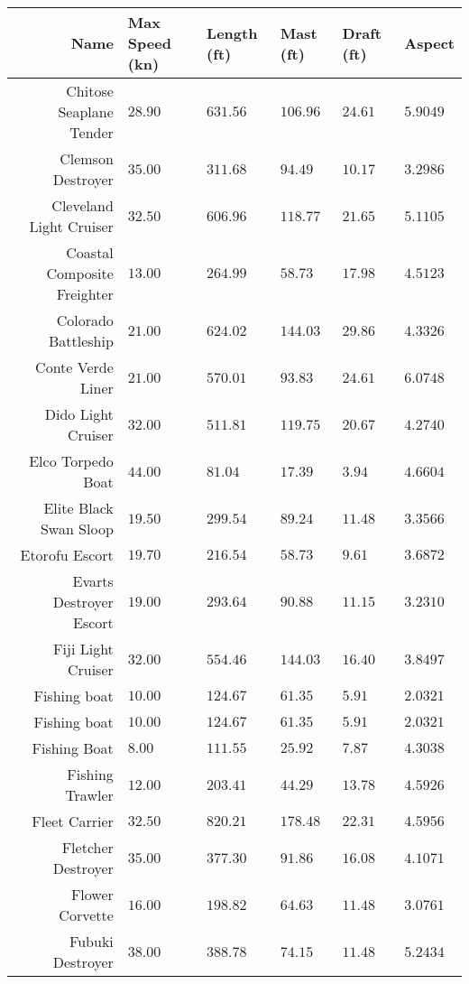 \documentclass{article}
\begin{document}
\pagebreak
\begin{tabularx}{\textwidth}{|r|l|l|X|X|X|}
\hline
Name & Max Speed (kn) & Length (ft) & Mast (ft) & Draft (ft) & Aspect\\
\hline
Chitose Seaplane Tender & $28.90$ & $631.56$ & $106.96$ & $24.61$ & $5.9049$ \\
\hline
Clemson Destroyer & $35.00$ & $311.68$ & $94.49$ & $10.17$ & $3.2986$ \\
\hline
Cleveland Light Cruiser & $32.50$ & $606.96$ & $118.77$ & $21.65$ & $5.1105$ \\
\hline
Coastal Composite Freighter & $13.00$ & $264.99$ & $58.73$ & $17.98$ & $4.5123$ \\
\hline
Colorado Battleship & $21.00$ & $624.02$ & $144.03$ & $29.86$ & $4.3326$ \\
\hline
Conte Verde Liner & $21.00$ & $570.01$ & $93.83$ & $24.61$ & $6.0748$ \\
\hline
Dido Light Cruiser & $32.00$ & $511.81$ & $119.75$ & $20.67$ & $4.2740$ \\
\hline
Elco Torpedo Boat & $44.00$ & $81.04$ & $17.39$ & $3.94$ & $4.6604$ \\
\hline
Elite Black Swan Sloop & $19.50$ & $299.54$ & $89.24$ & $11.48$ & $3.3566$ \\
\hline
Etorofu Escort & $19.70$ & $216.54$ & $58.73$ & $9.61$ & $3.6872$ \\
\hline
Evarts Destroyer Escort & $19.00$ & $293.64$ & $90.88$ & $11.15$ & $3.2310$ \\
\hline
Fiji Light Cruiser & $32.00$ & $554.46$ & $144.03$ & $16.40$ & $3.8497$ \\
\hline
Fishing boat & $10.00$ & $124.67$ & $61.35$ & $5.91$ & $2.0321$ \\
\hline
Fishing boat & $10.00$ & $124.67$ & $61.35$ & $5.91$ & $2.0321$ \\
\hline
Fishing Boat & $8.00$ & $111.55$ & $25.92$ & $7.87$ & $4.3038$ \\
\hline
Fishing Trawler & $12.00$ & $203.41$ & $44.29$ & $13.78$ & $4.5926$ \\
\hline
Fleet Carrier & $32.50$ & $820.21$ & $178.48$ & $22.31$ & $4.5956$ \\
\hline
Fletcher Destroyer & $35.00$ & $377.30$ & $91.86$ & $16.08$ & $4.1071$ \\
\hline
Flower Corvette & $16.00$ & $198.82$ & $64.63$ & $11.48$ & $3.0761$ \\
\hline
Fubuki Destroyer & $38.00$ & $388.78$ & $74.15$ & $11.48$ & $5.2434$ \\
\hline
\end{tabularx}
\pagebreak
\end{document}
